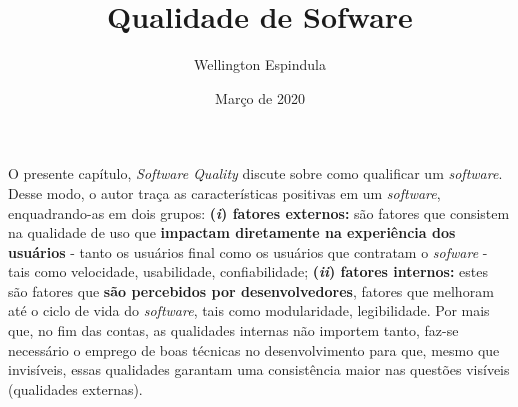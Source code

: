 \documentclass[12pt, a4paper]{article}
\title{Qualidade de Sofware}
\author{Wellington Espindula}
\date{Março de 2020}
\begin{document}
    \maketitle
    
    O presente capítulo, \textit{Software Quality} discute sobre como qualificar um \textit{software}. Desse modo, o autor traça as características positivas em um \textit{software}, enquadrando-as em dois grupos: \textbf{(\textit{i}) fatores externos:} são fatores que consistem na qualidade de uso que \textbf{impactam diretamente na experiência dos usuários} - tanto os usuários final como os usuários que contratam o \textit{sofware} - tais como velocidade, usabilidade, confiabilidade; \textbf{(\textit{ii}) fatores internos:} estes são fatores que \textbf{são percebidos por desenvolvedores}, fatores que melhoram até o ciclo de vida do \textit{software}, tais como modularidade, legibilidade. Por mais que, no fim das contas, as qualidades internas não importem tanto, faz-se necessário o emprego de boas técnicas no desenvolvimento para que, mesmo que invisíveis, essas qualidades garantam uma consistência maior nas questões visíveis (qualidades externas). \\
    
\end{document}
